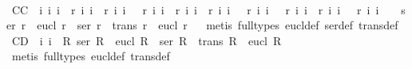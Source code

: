 \begin{isabellebody}
%
\isadelimproof
\ %
\endisadelimproof
%
\isatagproof
{}\isamarkupfalse%
\ %
%
\endisatagproof
{\isafoldproof}%
%
\isadelimproof
\isanewline
%
\endisadelimproof
{}\isamarkupfalse%
\ C{}{}{\isacharunderscore}C{\isacharcolon}\ {\isachardoublequoteopen}{\isacharhash}\ i{}\ i{}\ i{}\ {\isasymand}\ r\ i{}\ i{}\ {\isasymand}\ r\ i{}\ i{}\ {\isasymand}\ {\isasymnot}\ r\ i{}\ i{}\ {\isasymand}\ r\ i{}\ i{}\ {\isasymand}\ r\ i{}\ i{}\ {\isasymand}\ {\isasymnot}\ r\ i{}\ i{}\ {\isasymand}\ {\isasymnot}\ r\ i{}\ i{}\ {\isasymand}\ r\ i{}\ i{}\ {\isasymand}\ {\isasymnot}\ r\ i{}\ i{}\ \ {\isasymlongrightarrow}\ {\isasymnot}\ {\isacharparenleft}ser\ r\ {\isasymand}\ eucl\ r\ {\isasymlongrightarrow}\ {\isacharparenleft}ser\ r\ {\isasymand}\ trans\ r\ {\isasymand}\ eucl\ r{\isacharparenright}{\isacharparenright}{\isachardoublequoteclose}%
\isadelimproof
\ %
\endisadelimproof
%
\isatagproof
{}\isamarkupfalse%
\ {\isacharparenleft}metis\ {\isacharparenleft}full{\isacharunderscore}types{\isacharparenright}\ eucl{\isacharunderscore}def\ ser{\isacharunderscore}def\ trans{\isacharunderscore}def{\isacharparenright}%
\endisatagproof
{\isafoldproof}%
%
\isadelimproof
%
\endisadelimproof
\isanewline
{}\isamarkupfalse%
\ C{}{}{\isacharunderscore}D{\isacharcolon}\ {\isachardoublequoteopen}{\isacharhash}\ i{}\ i{}\ {\isasymlongrightarrow}\ {\isacharparenleft}{\isasymforall}R{\isachardot}\ ser\ R\ {\isasymand}\ eucl\ R\ {\isasymlongrightarrow}\ {\isacharparenleft}ser\ R\ {\isasymand}\ trans\ R\ {\isasymand}\ eucl\ R{\isacharparenright}{\isacharparenright}{\isachardoublequoteclose}\isanewline
%
\isadelimproof
\ %
\endisadelimproof
%
\isatagproof
{}\isamarkupfalse%
\ {\isacharparenleft}metis\ {\isacharparenleft}full{\isacharunderscore}types{\isacharparenright}\ eucl{\isacharunderscore}def\ trans{\isacharunderscore}def{\isacharparenright}%
\endisatagproof
{\isafoldproof}%
%
\isadelimproof
%
\endisadelimproof
%
\begin{isamarkuptext}%
\begin{isbfig}{7em}
\begin{tikzpicture}[shorten >=1pt,node distance=2cm,on grid,auto] 

\end{tikzpicture}
\end{isbfig}
\end{isamarkuptext}
\end{isabellebody}
